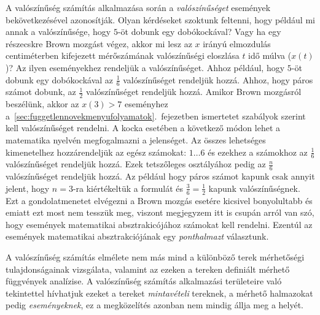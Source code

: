 \documentclass{article}
\begin{document}
A valószínűség számítás alkalmazása során a \textit{valószínűséget} események bekövetkezésével azonosítják. Olyan kérdéseket szoktunk feltenni, hogy például mi annak a valószínűsége, hogy $5$-öt dobunk egy dobókockával? Vagy ha egy részecskre Brown mozgást végez, akkor mi lesz az $x$ irányú elmozdulás centiméterben kifejezett mérőszámának valószínűségi eloszlása $t$ idő múlva ($x(t)$)? Az ilyen eseményekhez rendeljük a valószínűséget. Ahhoz például, hogy $5$-öt dobunk egy dobókockával az $\frac{1}{6}$ valószínűséget rendeljük hozzá. Ahhoz, hogy páros számot dobunk, az $\frac{1}{2}$ valószínűséget rendeljük hozzá. Amikor Brown mozgásról beszélünk, akkor az $x(3) > 7$ eseményhez a~\ref{sec:fuggetlennovekmenyufolyamatok}.\ fejezetben ismertetet szabályok szerint kell valószínűséget rendelni. A kocka esetében a következő módon lehet a matematika nyelvén megfogalmazni a jelenséget. Az összes lehetséges kimenetelhez hozzárendeljük az egész számokat: $1 \ldots 6$ és ezekhez a számokhoz az $\frac{1}{6}$ valószínűséget rendeljük hozzá. Ezek tetszőleges osztályához pedig az $\frac{n}{6}$ valószínűséget rendeljük hozzá. Az például hogy páros számot kapunk csak annyit jelent, hogy $n = 3$-ra kiértékeltük a formulát és $\frac{3}{6} = \frac{1}{2}$ kapunk valószínűségnek. Ezt a gondolatmenetet elvégezni a Brown mozgás esetére kicsivel bonyolultabb és emiatt ezt most nem tesszük meg, viszont megjegyzem itt is csupán arról van szó, hogy események matematikai absztrakicójához számokat kell rendelni. Ezentúl az események matematikai absztrakciójának egy \textit{ponthalmazt} választunk. 

A valószínűség számítás elmélete nem más mind a különböző terek mérhetőségi tulajdonságainak vizsgálata, valamint az ezeken a tereken definiált mérhető függvények analízise. A valószínűség számítás alkalmazási területeire való tekintettel hívhatjuk ezeket a tereket \textit{mintavételi} tereknek, a mérhető halmazokat pedig \textit{eseményeknek}, ez a megközelítés azonban nem mindig állja meg a helyét. 
\end{document}
